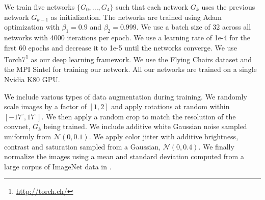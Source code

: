 \documentclass[10pt,twocolumn,letterpaper]{article}
\begin{document}
We train five networks $\{G_0, ..., G_4 \}$ such that each network $G_k$ uses the previous network $G_{k-1}$ as initialization. The networks are trained using Adam \cite{kingma2014adam} optimization with $\beta_1 = 0.9$ and $\beta_2 = 0.999$. We use a batch size of 32 across all networks with 4000 iterations per epoch. We use a learning rate of 1e-4 for the first 60 epochs and decrease it to 1e-5 until the networks converge. We use Torch7\footnote{\url{http://torch.ch/}} as our deep learning framework. We use the Flying Chairs \cite{dosovitskiy2015flownet} dataset and the MPI Sintel \cite{Butler:ECCV:2012} for training our network. 
All our networks are trained on a single Nvidia K80 GPU.

We include various types of data augmentation during training. We randomly scale images by a factor of $[1, 2]$ and apply rotations at random within $[-17^{\circ}, 17^{\circ}]$. We then apply a random crop to match the resolution of the convnet, $G_k$ being trained. We include additive white Gaussian noise sampled uniformly from $\mathcal{N}(0, 0.1)$. We apply color jitter with additive brightness, contrast and saturation sampled from a Gaussian, $\mathcal{N}(0, 0.4)$. We finally normalize the images using a mean and standard deviation computed from a large corpus of ImageNet \cite{ILSVRC15} data in \cite{he2015deep}.

\end{document}
